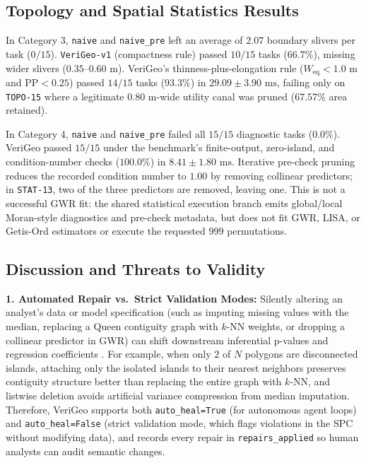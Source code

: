 \documentclass[10pt,twocolumn]{article}
\begin{document}
\subsection{Topology and Spatial Statistics Results}
In Category 3, \texttt{naive} and \texttt{naive\_pre} left an average of $2.07$ boundary slivers per task ($0/15$). \texttt{VeriGeo-v1} (compactness rule) passed $10/15$ tasks ($66.7\%$), missing wider slivers ($0.35\text{--}0.60\text{ m}$). VeriGeo's thinness-plus-elongation rule ($W_{\text{eq}} < 1.0\text{ m}$ and $\text{PP} < 0.25$) passed $14/15$ tasks ($93.3\%$) in $29.09 \pm 3.90\text{ ms}$, failing only on \texttt{TOPO-15} where a legitimate $0.80\text{ m}$-wide utility canal was pruned ($67.57\%$ area retained).

In Category 4, \texttt{naive} and \texttt{naive\_pre} failed all $15/15$ diagnostic tasks ($0.0\%$). VeriGeo passed $15/15$ under the benchmark's finite-output, zero-island, and condition-number checks ($100.0\%$) in $8.41 \pm 1.80\text{ ms}$. Iterative pre-check pruning reduces the recorded condition number to $1.00$ by removing collinear predictors; in \texttt{STAT-13}, two of the three predictors are removed, leaving one. This is not a successful GWR fit: the shared statistical execution branch emits global/local Moran-style diagnostics and pre-check metadata, but does not fit GWR, LISA, or Getis-Ord estimators or execute the requested $999$ permutations.

\subsection{Discussion and Threats to Validity}
\textbf{1. Automated Repair vs.\ Strict Validation Modes:} Silently altering an analyst's data or model specification (such as imputing missing values with the median, replacing a Queen contiguity graph with $k$-NN weights, or dropping a collinear predictor in GWR) can shift downstream inferential p-values and regression coefficients \cite{cliff1981spatial,wheeler2005multicollinearity}. For example, when only $2$ of $N$ polygons are disconnected islands, attaching only the isolated islands to their nearest neighbors preserves contiguity structure better than replacing the entire graph with $k$-NN, and listwise deletion avoids artificial variance compression from median imputation. Therefore, VeriGeo supports both \texttt{auto\_heal=True} (for autonomous agent loops) and \texttt{auto\_heal=False} (strict validation mode, which flags violations in the SPC without modifying data), and records every repair in \texttt{repairs\_applied} so human analysts can audit semantic changes.
\end{document}
